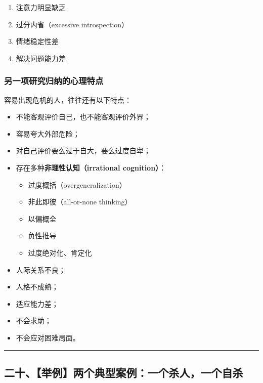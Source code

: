 \documentclass[
  chinese,
  9pt,
  a4paper,
]{ctexart}
\providecommand{\tightlist}{%
  \setlength{\itemsep}{0pt}\setlength{\parskip}{0pt}}
\begin{document}
\begin{enumerate}
\def\labelenumi{\arabic{enumi}.}
\tightlist
\item
  注意力明显缺乏
\item
  过分内省（excessive introspection）
\item
  情绪稳定性差
\item
  解决问题能力差
\end{enumerate}

\subsubsection{另一项研究归纳的心理特点}\label{ux53e6ux4e00ux9879ux7814ux7a76ux5f52ux7eb3ux7684ux5fc3ux7406ux7279ux70b9}

容易出现危机的人，往往还有以下特点：

\begin{itemize}
\item
  不能客观评价自己，也不能客观评价外界；
\item
  容易夸大外部危险；
\item
  对自己评价要么过于自大，要么过度自卑；
\item
  存在多种\textbf{非理性认知（irrational cognition）}：

  \begin{itemize}
  \tightlist
  \item
    过度概括（overgeneralization）
  \item
    非此即彼（all-or-none thinking）
  \item
    以偏概全
  \item
    负性推导
  \item
    过度绝对化、肯定化
  \end{itemize}
\item
  人际关系不良；
\item
  人格不成熟；
\item
  适应能力差；
\item
  不会求助；
\item
  不会应对困难局面。
\end{itemize}

\begin{center}\rule{0.5\linewidth}{0.5pt}\end{center}

\subsection{二十、【举例】两个典型案例：一个杀人，一个自杀}\label{ux4e8cux5341ux4e3eux4f8bux4e24ux4e2aux5178ux578bux6848ux4f8bux4e00ux4e2aux6740ux4ebaux4e00ux4e2aux81eaux6740}
\end{document}

